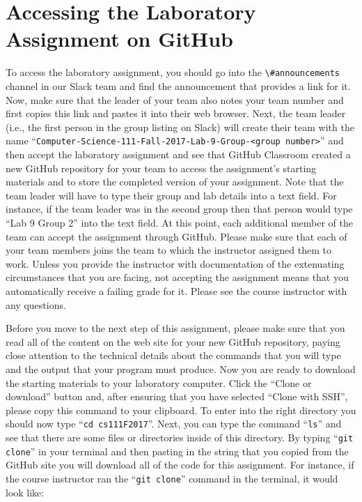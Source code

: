 \documentclass[11pt]{article}
\newcommand{\command}[1]{``\lstinline{#1}''}
\newcommand{\channel}[1]{\lstinline{#1}}
\begin{document}
\section*{Accessing the Laboratory Assignment on GitHub}

To access the laboratory assignment, you should go into the \channel{\#announcements} channel in our Slack team and find
the announcement that provides a link for it. Now, make sure that the leader of your team also notes your team number
and first copies this link and pastes it into their web browser. Next, the team leader (i.e., the first person in the
group listing on Slack) will create their team with the name \command{Computer-Science-111-Fall-2017-Lab-9-Group-<group
number>} and then accept the laboratory assignment and see that GitHub Classroom created a new GitHub repository for
your team to access the assignment's starting materials and to store the completed version of your assignment. Note that
the team leader will have to type their group and lab details into a text field. For instance, if the team leader was in
the second group then that person would type ``Lab 9 Group 2'' into the text field. At this point, each additional
member of the team can accept the assignment through GitHub. Please make sure that each of your team members joins the
team to which the instructor assigned them to work. Unless you provide the instructor with documentation of the
extenuating circumstances that you are facing, not accepting the assignment means that you automatically receive a
failing grade for it. Please see the course instructor with any questions.

Before you move to the next step of this assignment, please make sure that you read all of the content on the web site
for your new GitHub repository, paying close attention to the technical details about the commands that you will type
and the output that your program must produce. Now you are ready to download the starting materials to your laboratory
computer. Click the ``Clone or download'' button and, after ensuring that you have selected ``Clone with SSH'', please
copy this command to your clipboard. To enter into the right directory you should now type \command{cd cs111F2017}.
Next, you can type the command \command{ls} and see that there are some files or directories inside of this directory.
By typing \command{git clone} in your terminal and then pasting in the string that you copied from the GitHub site you
will download all of the code for this assignment. For instance, if the course instructor ran the \command{git clone}
command in the terminal, it would look like:
\end{document}
